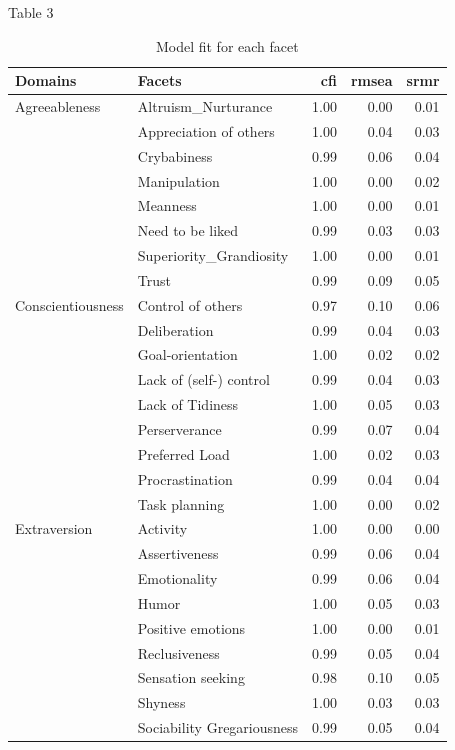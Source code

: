 \documentclass[,man,floatsintext]{apa6}
\theoremstyle{definition}
\theoremstyle{definition}
\theoremstyle{definition}
\theoremstyle{remark}
\begin{document}
Table 3

\begin{table}[ht]
\centering
\caption{Model fit for each facet} 
\begingroup\fontsize{9.5pt}{9pt}\selectfont
\begin{tabular}{llrrr}
  \hline
Domains & Facets & cfi & rmsea & srmr \\ 
  \hline
Agreeableness & Altruism\_Nurturance & 1.00 & 0.00 & 0.01 \\ 
   & Appreciation of others & 1.00 & 0.04 & 0.03 \\ 
   & Crybabiness & 0.99 & 0.06 & 0.04 \\ 
   & Manipulation & 1.00 & 0.00 & 0.02 \\ 
   & Meanness & 1.00 & 0.00 & 0.01 \\ 
   & Need to be liked & 0.99 & 0.03 & 0.03 \\ 
   & Superiority\_Grandiosity & 1.00 & 0.00 & 0.01 \\ 
   & Trust & 0.99 & 0.09 & 0.05 \\ 
  Conscientiousness & Control of others & 0.97 & 0.10 & 0.06 \\ 
   & Deliberation & 0.99 & 0.04 & 0.03 \\ 
   & Goal-orientation & 1.00 & 0.02 & 0.02 \\ 
   & Lack of (self-) control & 0.99 & 0.04 & 0.03 \\ 
   & Lack of Tidiness & 1.00 & 0.05 & 0.03 \\ 
   & Perserverance & 0.99 & 0.07 & 0.04 \\ 
   & Preferred Load & 1.00 & 0.02 & 0.03 \\ 
   & Procrastination & 0.99 & 0.04 & 0.04 \\ 
   & Task planning & 1.00 & 0.00 & 0.02 \\ 
  Extraversion & Activity & 1.00 & 0.00 & 0.00 \\ 
   & Assertiveness & 0.99 & 0.06 & 0.04 \\ 
   & Emotionality & 0.99 & 0.06 & 0.04 \\ 
   & Humor & 1.00 & 0.05 & 0.03 \\ 
   & Positive emotions & 1.00 & 0.00 & 0.01 \\ 
   & Reclusiveness & 0.99 & 0.05 & 0.04 \\ 
   & Sensation seeking & 0.98 & 0.10 & 0.05 \\ 
   & Shyness & 1.00 & 0.03 & 0.03 \\ 
   & Sociability Gregariousness & 0.99 & 0.05 & 0.04 \\ 

\end{tabular}
\end{table}
\end{document}
